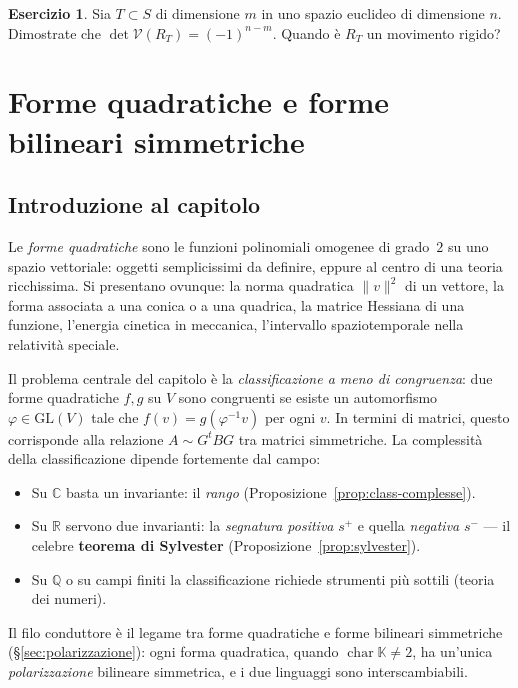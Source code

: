 \documentclass[11pt, a4paper]{book}
\theoremstyle{definition}
\newtheorem{esercizio}[definizione]{Esercizio}
\theoremstyle{plain}
\theoremstyle{remark}
\newcommand{\Q}{\mathbb{Q}}
\newcommand{\R}{\mathbb{R}}
\newcommand{\C}{\mathbb{C}}
\newcommand{\K}{\mathbb{K}}
\DeclareMathOperator{\car}{char}
\newcommand{\GL}{\mathrm{GL}}
\begin{document}
\begin{esercizio}
Sia $T \subset S$ di dimensione $m$ in uno spazio euclideo di dimensione $n$. Dimostrate che $\det\mathcal{V}(R_T)=(-1)^{n-m}$. Quando è $R_T$ un movimento rigido?
\end{esercizio}


\chapter{Forme quadratiche e forme bilineari simmetriche}
\label{cap:forme-quadratiche}

\section*{Introduzione al capitolo}

Le \emph{forme quadratiche} sono le funzioni polinomiali omogenee di grado~$2$ su uno spazio vettoriale: oggetti semplicissimi da definire, eppure al centro di una teoria ricchissima. Si presentano ovunque: la norma quadratica $\|v\|^2$ di un vettore, la forma associata a una conica o a una quadrica, la matrice Hessiana di una funzione, l'energia cinetica in meccanica, l'intervallo spaziotemporale nella relatività speciale.

Il problema centrale del capitolo è la \emph{classificazione a meno di congruenza}: due forme quadratiche $f, g$ su $V$ sono congruenti se esiste un automorfismo $\varphi \in \GL(V)$ tale che $f(v) = g(\varphi^{-1}v)$ per ogni $v$. In termini di matrici, questo corrisponde alla relazione $A \sim G^t B G$ tra matrici simmetriche. La complessità della classificazione dipende fortemente dal campo:
\begin{itemize}
  \item Su $\C$ basta un invariante: il \emph{rango} (Proposizione~\ref{prop:class-complesse}).
  \item Su $\R$ servono due invarianti: la \emph{segnatura positiva} $s^+$ e quella \emph{negativa} $s^-$ --- il celebre \textbf{teorema di Sylvester} (Proposizione~\ref{prop:sylvester}).
  \item Su $\Q$ o su campi finiti la classificazione richiede strumenti più sottili (teoria dei numeri).
\end{itemize}

Il filo conduttore è il legame tra forme quadratiche e forme bilineari simmetriche (§\ref{sec:polarizzazione}): ogni forma quadratica, quando $\car\K \neq 2$, ha un'unica \emph{polarizzazione} bilineare simmetrica, e i due linguaggi sono interscambiabili.
\end{document}
